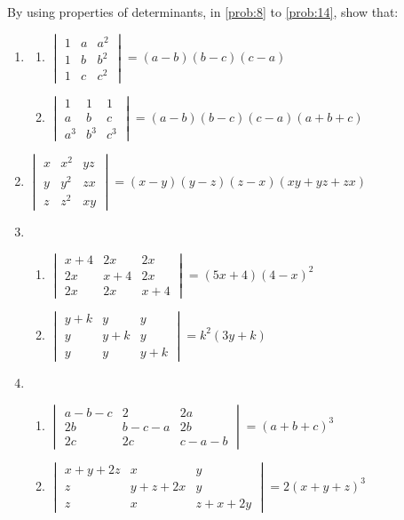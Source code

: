\documentclass{article}
\theoremstyle{remark}
\begin{document}
By using properties of determinants, in \ref{prob:8} to \ref{prob:14}, show that:
\begin{enumerate}[resume]
\item \label{prob:8}
\begin{enumerate}[label=(\roman*)]
\item $\begin{vmatrix} 1&a&a^2\\ 1&b&b^2\\ 1&c&c^2 \end{vmatrix} = (a-b) (b-c) (c-a)$
\item $\begin{vmatrix} 1&1&1\\ a&b&c\\ a^3&b^3&c^3 \end{vmatrix} = (a-b) (b-c) (c-a) (a+b+c)$
\end{enumerate}
\item $\begin{vmatrix} x&x^2&yz\\  y&y^2&zx\\ z&z^2&xy \end{vmatrix} = (x-y) (y-z) (z-x) (xy+yz+zx)$
\item
\begin{enumerate}[label=(\roman*)]
\item $\begin{vmatrix} x+4&2x&2x\\ 2x&x+4&2x\\ 2x&2x&x+4 \end{vmatrix} = (5x+4)(4-x)^2$
\item $\begin{vmatrix} y+k&y&y\\ y&y+k&y\\ y&y&y+k \end{vmatrix}=k^2(3y+k)$
\end{enumerate}
\item
\begin{enumerate}[label=(\roman*)]
\item $\begin{vmatrix} a-b-c&2&2a\\ 2b&b-c-a&2b\\ 2c&2c&c-a-b \end{vmatrix} = (a+b+c)^3$  
\item $\begin{vmatrix} x+y+2z&x&y\\ z&y+z+2x&y\\ z&x&z+x+2y \end{vmatrix}= 2(x+y+z)^3$

\end{enumerate}
\end{enumerate}
\end{document}
